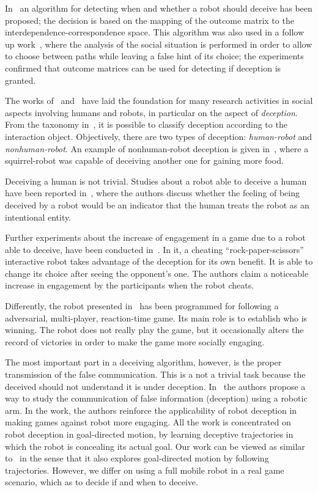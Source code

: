 In~\cite{wagner_robot_2009} an algorithm for detecting when and whether a robot should deceive has been proposed; the decision is based on the mapping of the outcome matrix to the interdependence-correspondence space. This algorithm was also used in a follow up work~\cite{wagner_acting_2011}, where the analysis of the social situation is performed in order to allow to choose between paths while leaving a false hint of its choice; the experiments confirmed that outcome matrices can be used for detecting if deception is granted.

The works of~\cite{kelley_interpersonal_1978} and~\cite{wagner_analyzing_2008, wagner_acting_2011, wagner_robot_2009} have laid the foundation for many research activities in social aspects involving humans and robots, in particular on the aspect of \textit{deception}. From the taxonomy in~\cite{shim_taxonomy_2013}, it is possible to classify deception according to the interaction object. Objectively, there are two types of deception: \textit{human-robot} and \textit{nonhuman-robot}. An example of nonhuman-robot deception is given in~\cite{shim_biologically-inspired_2012}, where a squirrel-robot was capable of deceiving another one for gaining more food. 

Deceiving a human is not trivial. Studies about a robot able to deceive a human have been reported in~\cite{terada_can_2010}, where the authors discuss whether the feeling of being deceived by a robot would be an indicator that the human treats the robot as an intentional entity. 

Further experiments about the increase of engagement in a game due to a robot able to deceive, have been conducted in~\cite{short_no_2010}. In it, a cheating ``rock-paper-scissors'' interactive robot takes advantage of the deception for its own benefit. It is able to change its choice after seeing the opponent's one. The authors claim a noticeable increase in engagement by the participants when the robot cheats.

Differently, the robot presented in~\cite{vazquez_deceptive_2011} has been programmed for following a adversarial, multi-player, reaction-time game. Its main role is to establish who is winning. The robot does not really play the game, but it occasionally alters the record of victories in order to make the game more socially engaging.

The most important part in a deceiving algorithm, however, is the proper transmission of the false communication. This is a not a trivial task because the deceived should not understand it is under deception. In~\cite{dragan_analysis_2014} the authors propose a way to study the communication of false information (deception) using a robotic arm. In the work, the authors reinforce the applicability of robot deception in making games against robot more engaging. All the work is concentrated on robot deception in goal-directed motion, by learning deceptive trajectories in which the robot is concealing its actual goal. Our work can be viewed as similar to~\cite{dragan_analysis_2014} in the sense that it also explores goal-directed motion by following trajectories. However, we differ on using a full mobile robot in a real game scenario, which as to decide if and when to deceive. 


